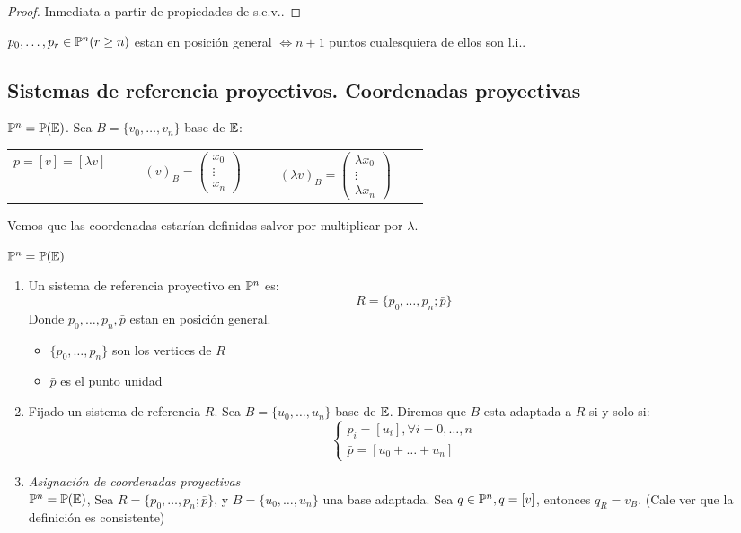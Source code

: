 \begin{proof}
    Inmediata a partir de propiedades de s.e.v..
\end{proof}
\begin{defi}
    $p_0, \dots, p_r \in \mathbb{P}^n (r \geq n)$ estan en posición general $\iff n+1$ puntos cualesquiera de ellos son l.i..
\end{defi}

\subsection{Sistemas de referencia proyectivos. Coordenadas proyectivas}

\begin{obs}
    $\mathbb{P}^n = \mathbb{P}(\mathbb{E})$. Sea $B = \{v_0, \dots, v_n\}$ base de $\mathbb{E}$:
    \begin{center} \begin{tabular}{ccc}
        $p = [v] = [\lambda v] \qquad $ &
        $(v)_B = \begin{pmatrix} x_0 \\ \vdots \\ x_n \end{pmatrix}\qquad $&
        $(\lambda v)_B = \begin{pmatrix} \lambda x_0 \\ \vdots \\ \lambda x_n \end{pmatrix} \qquad$
    \end{tabular} \end{center}
    Vemos que las coordenadas estarían definidas salvor por multiplicar por $\lambda$.
\end{obs}
\begin{defi}
    $\mathbb{P}^n = \mathbb{P}(\mathbb{E})$
    \begin{enumerate}
        \item Un sistema de referencia proyectivo en $\mathbb{P}^n$ es:
            \[ R= \{ p_0, \dots, p_n; \bar{p} \} \]
            Donde $p_0, \dots, p_n, \bar{p}$ estan en posición general.
            \begin{itemize}
                \item $\{ p_0, \dots, p_n \}$ son los vertices de $R$
                \item $\bar{p}$ es el punto unidad
            \end{itemize}
        \item Fijado un sistema de referencia $R$. Sea $B = \{ u_0, \dots, u_n \}$ base de $\mathbb{E}$. Diremos que $B$ esta adaptada a $R$ si y solo si:
            \[ \begin{cases} p_i = [u_i], \forall i = 0, \dots, n \\ \bar{p} = [u_0 + \dots + u_n ] \end{cases} \]
        \item \textit{Asignación de coordenadas proyectivas} \\
            $\mathbb{P}^n = \mathbb{P}(\mathbb{E})$, Sea $R = \{ p_0, \dots, p_n; \bar{p} \}$, y $B = \{u_0, \dots, u_n\}$ una base adaptada. Sea $q \in \mathbb{P}^n, q = [v]$, entonces 
            $q_R = v_B$. (Cale ver que la definición es consistente)
    \end{enumerate}
\end{defi}
